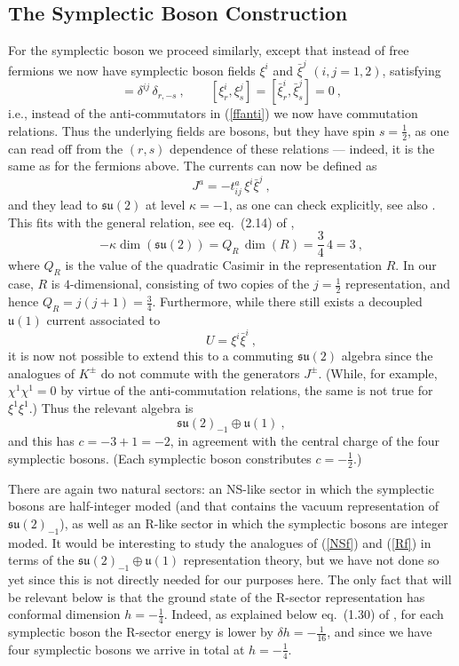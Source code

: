 \documentclass[12pt,a4paper]{article}
\newcommand{\be}{ \begin{equation}}
\newcommand{\ee}{\end{equation}}
\begin{document}
\subsection{The Symplectic Boson Construction}

For the symplectic boson we proceed similarly, except that instead of free fermions we now have symplectic boson fields $\xi^{i}$ and $\bar{\xi}^j$ $(i,j=1,2)$, satisfying  \cite{Goddard:1987td}
\be
[\xi^i_r,\bar{\xi}^j_s] = \delta^{ij}\, \delta_{r,-s} \ , \qquad [\xi^i_r,\xi^j_s] = [\bar{\xi}^i_r,\bar{\xi}^j_s] =  0 \ ,
\ee
i.e., instead of the anti-commutators in (\ref{ffanti}) we now have commutation relations. Thus the underlying fields are bosons, but they have spin $s=\frac{1}{2}$, as one can read off from the $(r,s)$ dependence of these relations --- indeed, it is the same as for the fermions above. The currents can now be defined as
\be
J^a = - t^a_{ij} \, \xi^i \bar{\xi}^j \ , 
\ee
and they lead to $\mathfrak{su}(2)$ at level $\kappa=-1$, as one can check explicitly, see also \cite[eq.~(3.19)]{Beem:2014rza}. This fits with the general relation, see eq.~(2.14) of  \cite{Goddard:1987td}, \be\label{kappap}
- \kappa  \dim(\mathfrak{su}(2)) =   Q_R \, \dim(R) = \frac{3}{4}\, 4  = 3 \ ,
\ee
where $Q_R$ is the value of the quadratic Casimir in the representation $R$. In our case, $R$ is $4$-dimensional, consisting of two copies of the $j=\frac{1}{2}$ representation, and hence $Q_R = j (j+1) = \frac{3}{4}$. Furthermore, while there still exists a decoupled $\mathfrak{u}(1)$ current associated to 
\be
U = \xi^i \bar{\xi}^i \ , 
\ee
it is now not possible to extend this to a commuting $\mathfrak{su}(2)$ algebra since the analogues  of $K^\pm$ do not commute with the generators $J^\pm$. (While, for example, $\chi^1\chi^1=0$ by virtue of the anti-commutation relations, the same is not true for $\xi^1\xi^1$.) Thus the relevant algebra is 
\be\label{su2m1}
\mathfrak{su}(2)_{-1} \oplus \mathfrak{u}(1) \ , 
\ee
and this has $c=-3+1 = -2$, in agreement with the central charge of the four symplectic bosons. (Each symplectic boson constributes $c=-\frac{1}{2}$.)

There are again two natural sectors: an NS-like sector in which the symplectic bosons are half-integer moded (and that contains the vacuum representation of $\mathfrak{su}(2)_{-1}$), as well as an R-like sector in which the symplectic bosons are integer moded. It would be interesting to study the analogues of (\ref{NSf}) and (\ref{Rf}) in terms of the $\mathfrak{su}(2)_{-1}\oplus \mathfrak{u}(1)$ representation theory, but we have not done so yet since this is not directly needed for our purposes here. The only fact that will be relevant below is that the ground state of the R-sector representation has conformal dimension $h=-\frac{1}{4}$. Indeed, as explained  below eq.~(1.30) of \cite{Goddard:1987td}, for each symplectic boson the R-sector energy is lower by $\delta h = -\frac{1}{16}$, and since we have four symplectic bosons we arrive in total at $h=-\frac{1}{4}$.
\end{document}
